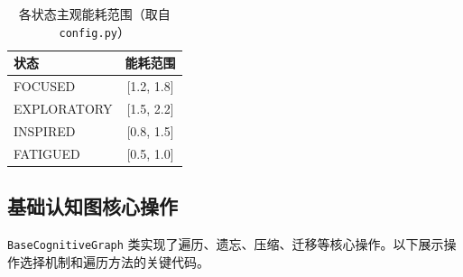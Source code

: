 \documentclass[12pt,a4paper]{article}
\begin{document}
\begin{table}[H]
\centering
\caption{各状态主观能耗范围（取自 \texttt{config.py}）}
\label{tab:energy_ranges_app}
\begin{tabular}{lc}
\toprule
\textbf{状态} & \textbf{能耗范围} \\
\midrule
FOCUSED      & [1.2, 1.8] \\
EXPLORATORY  & [1.5, 2.2] \\
INSPIRED     & [0.8, 1.5] \\
FATIGUED     & [0.5, 1.0] \\
\bottomrule
\end{tabular}
\end{table}

\subsection{基础认知图核心操作}
\texttt{BaseCognitiveGraph} 类实现了遍历、遗忘、压缩、迁移等核心操作。以下展示操作选择机制和遍历方法的关键代码。
\end{document}
